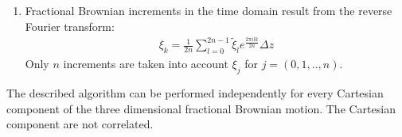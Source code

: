 \documentclass[
  a4paper,BCOR10mm,oneside,
  bibtotoc,idxtotoc,
  headsepline,footsepline,%
  fleqn,openbib
]{scrbook}
\begin{document}
\begin{enumerate}
 \item Fractional Brownian increments in the time domain result from the reverse Fourier transform:
 \begin{align}
 \xi_{k}= \frac{1}{2n} \sum_{l=0}^{2n-1}  \tilde{\xi}_l e^{\frac{2 \pi i l k }{2n}} \Delta z
 \end{align}
Only $n$ increments are taken into account $\xi_{j}$ for $j=(0,1,..,n)$.
\end{enumerate}
The described algorithm can be performed independently for every Cartesian component of the three dimensional fractional Brownian motion. The Cartesian component are not correlated.
\end{document}

